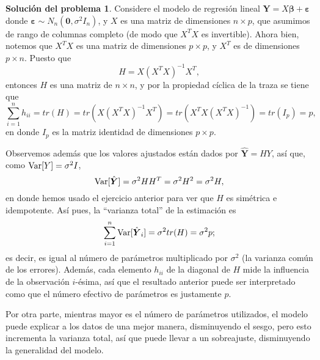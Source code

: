 \documentclass[twoside,12pt]{article}
\theoremstyle{definition}
\newtheorem{soln}{Solución del problema}
\newcommand{\variance}{\mathrm{\normalfont Var}}
\begin{document}
\newpage
\begin{soln}
Considere el modelo de regresión lineal $\boldsymbol{Y}=X\boldsymbol{\beta} + \boldsymbol{\varepsilon}$ donde $\boldsymbol{\varepsilon}\sim N_n(\boldsymbol{0},\sigma^2 I_n)$, y $X$ es una matriz de dimensiones $n\times p$, que asumimos de rango de columnas completo (de modo que $X^T X$ es invertible). Ahora bien, notemos que $X^T X$ es una matriz de dimensiones $p\times p$, y $X^T$ es de dimensiones $p\times n$. Puesto que 
\[
H=X{(X^T X)}^{-1}X^T,
\]
entonces $H$ es una matriz de $n\times n$, y por la propiedad cíclica de la traza se tiene que
\[
\sum_{i=1}^{n} h_{ii} = tr(H) = tr\left(X{(X^T X)}^{-1}X^T\right) = tr\left(X^T X {(X^T X)}^{-1}\right) = tr(I_p)=p,
\]
en donde $I_p$ es la matriz identidad de dimensiones $p\times p$.

Observemos además que los valores ajustados están dados por $\hat{\boldsymbol{Y}}=HY$, así que, como $\variance[Y]=\sigma^2 I$,
\[
\variance[\hat{\boldsymbol{Y}}] = \sigma^2 H H^T = \sigma^2 H^2 = \sigma^2 H,
\]
en donde hemos usado el ejercicio anterior para ver que $H$ es simétrica e idempotente. Así pues, la ``varianza total'' de la estimación es
\[
\sum_{i=1}^{n} \variance[\hat{\boldsymbol{Y}}_i] = \sigma^2 tr(H) = \sigma^2 p;
\]
es decir, es igual al número de parámetros multiplicado por $\sigma^2$ (la varianza común de los errores). Además, cada elemento $h_{ii}$ de la diagonal de $H$ mide la influencia de la observación $i$-ésima, así que el resultado anterior puede ser interpretado como que el número efectivo de parámetros es justamente $p$.

Por otra parte, mientras mayor es el número de parámetros utilizados, el modelo puede explicar a los datos de una mejor manera, disminuyendo el sesgo, pero esto incrementa la varianza total, así que puede llevar a un sobreajuste, disminuyendo la generalidad del modelo.
\end{soln}
\end{document}
